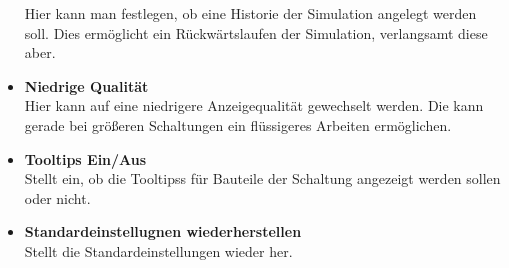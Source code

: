\documentclass[12pt,a4paper]{scrartcl}
\begin{document}
\begin{itemize}
      Hier kann man festlegen, ob eine Historie der Simulation angelegt werden soll. Dies ermöglicht ein Rückwärtslaufen der Simulation, verlangsamt diese aber.
   \item \textbf{Niedrige Qualität} \\
      Hier kann auf eine niedrigere Anzeigequalität gewechselt werden. Die kann gerade bei größeren Schaltungen ein flüssigeres Arbeiten ermöglichen.
   \item \textbf{Tooltips Ein/Aus} \\
      Stellt ein, ob die \glspl{Tooltip}s für Bauteile der Schaltung angezeigt werden sollen oder nicht.
   \item \textbf{Standardeinstellugnen wiederherstellen} \\
      Stellt die Standardeinstellungen wieder her.
  \end{itemize}
\end{document}
